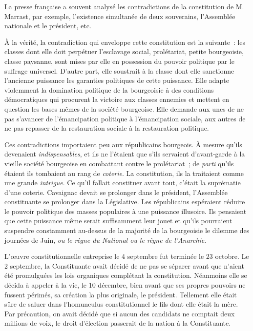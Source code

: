 \documentclass[french,twoside]{book} %
\begin{document}
La presse française a souvent analysé les contradictions de la constitution de M. Marrast, par exemple, l’existence simultanée de deux souverains, l’Assemblée nationale et le président, etc.\par
À la vérité, la contradiction qui enveloppe cette constitution est la suivante : les classes dont elle doit perpétuer l’esclavage social, prolétariat, petite bourgeoisie, classe paysanne, sont mises par elle en possession du pouvoir politique par le suffrage universel. D’autre part, elle soustrait à la classe dont elle sanctionne l’ancienne puissance les garanties politiques de cette puissance. Elle adapte violemment la domination politique de la bourgeoisie à des conditions démocratiques qui procurent la victoire aux classes ennemies et mettent en question les bases mêmes de la société bourgeoise. Elle demande aux unes de ne pas s’avancer de l’émancipation politique à l’émancipation sociale, aux autres de ne pas repasser de la restauration sociale à la restauration politique.\par
Ces contradictions importaient peu aux républicains bourgeois. À mesure qu’ils devenaient \emph{indispensables}, et ils ne l’étaient que s’ils servaient d’avant-garde à la vieille société bourgeoise en combattant contre le prolétariat ; de \emph{parti} qu’ils étaient ils tombaient au rang de \emph{coterie}. La constitution, ils la traitaient comme une grande \emph{intrigue}. Ce qu’il fallait constituer avant tout, c’était la suprématie d’une coterie. Cavaignac devait se prolonger dans le président, l’Assemblée constituante se prolonger dans la Législative. Les républicains espéraient réduire le pouvoir politique des masses populaires à une puissance illusoire. Ils pensaient que cette puissance même serait suffisamment leur jouet et qu’ils pourraient suspendre constamment au-dessus de la majorité de la bourgeoisie le dilemme des journées de Juin, \emph{ou le règne du National ou le règne de l’Anarchie}.\par
L’œuvre constitutionnelle entreprise le 4 septembre fut terminée le 23 octobre. Le 2 septembre, la Constituante avait décidé de ne pas se séparer avant que n’aient été promulguées les lois organiques complétant la constitution. Néanmoins elle se décida à appeler à la vie, le 10 décembre, bien avant que ses propres pouvoirs ne fussent périmés, sa création la plus originale, le président. Tellement elle était sûre de saluer dans l’homunculus constitutionnel le fils dont elle était la mère. Par précaution, on avait décidé que si aucun des candidats ne comptait deux millions de voix, le droit d’élection passerait de la nation à la Constituante.\par
\end{document}
